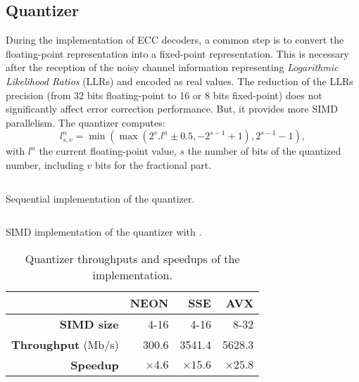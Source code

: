 \subsection{Quantizer}
\label{sec:opt_simu_quantizer}

During the implementation of ECC decoders, a common step is to convert the
floating-point representation into a fixed-point representation. This is
necessary after the reception of the noisy channel information representing
\textit{Logarithmic Likelihood Ratios} (LLRs) and encoded as real values. The
reduction of the LLRs precision (from 32 bits floating-point to 16 or 8 bits
fixed-point) does not significantly affect error correction performance. But, it
provides more SIMD parallelism. The quantizer computes:
\begin{equation}
\label{eq:opt_simu_quantizer}
l_{s,v}^n = \min(\max(2^v . l^n \pm 0.5, -2^{s-1} +1), 2^{s-1} -1),
\end{equation}
with $l^n$ the current floating-point value, $s$ the number of bits of the
quantized number, including $v$ bits for the fractional part.

\begin{listing}[htp]
  \inputminted[frame=lines,linenos]{C++}{\curChapter/src/simu/quantizer/quantizer_seq.cpp}
  \caption{Sequential implementation of the quantizer.}
  \label{lst:opt_simu_quantizer_seq}
\end{listing}

\begin{listing}[htp]
  \inputminted[frame=lines,linenos]{C++}{\curChapter/src/simu/quantizer/quantizer_simd.cpp}
  \caption{SIMD implementation of the quantizer with \MIPP.}
  \label{lst:opt_simu_quantizer_simd}
\end{listing}

\begin{table}[htp]
  \centering
  \caption{Quantizer throughputs and speedups of the \MIPP implementation.}
  \label{tab:opt_simu_quantizer_speedup}
  \begin{tabular}{r | r  r r}
                             & \textbf{NEON} & \textbf{SSE}  & \textbf{AVX}  \\ \hline \hline
  \textbf{SIMD size}         & 4-16          & 4-16          & 8-32          \\
  \textbf{Throughput} (Mb/s) & 300.6         & 3541.4        & 5628.3        \\
  \textbf{Speedup}           & $\times 4.6$  & $\times 15.6$ & $\times 25.8$ \\
  \end{tabular}
\end{table}

